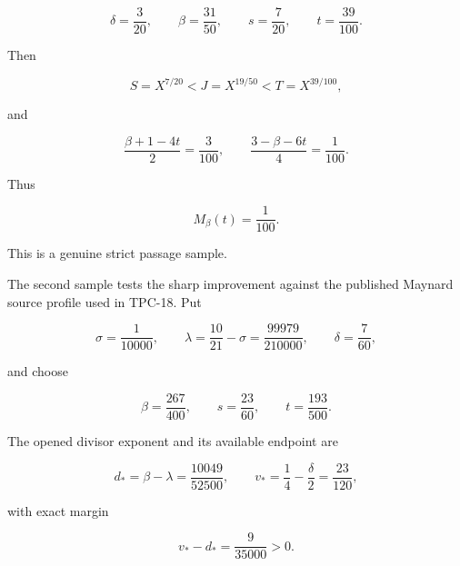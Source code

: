 \begin{equation}
 \delta=\frac3{20},
 \qquad
 \beta=\frac{31}{50},
 \qquad
 s=\frac7{20},
 \qquad
 t=\frac{39}{100}.
 \label{eq:tpc26-old-sample}
\end{equation}

Then

\begin{equation}
 S=X^{7/20}<J=X^{19/50}<T=X^{39/100},
 \label{eq:tpc26-old-sample-scales}
\end{equation}

and

\begin{equation}
 \frac{\beta+1-4t}{2}=\frac3{100},
 \qquad
 \frac{3-\beta-6t}{4}=\frac1{100}.
 \label{eq:tpc26-old-sample-ledger}
\end{equation}

Thus

\begin{equation}
 \boxed{M_\beta(t)=\frac1{100}.}
 \label{eq:tpc26-old-sample-saving}
\end{equation}

This is a genuine strict passage sample.

The second sample tests the sharp improvement against the published
Maynard source profile used in TPC-18.  Put

\begin{equation}
 \sigma=\frac1{10000},
 \qquad
 \lambda=\frac{10}{21}-\sigma
 =\frac{99979}{210000},
 \qquad
 \delta=\frac7{60},
 \label{eq:tpc26-high-sample-source}
\end{equation}

and choose

\begin{equation}
 \beta=\frac{267}{400},
 \qquad
 s=\frac{23}{60},
 \qquad
 t=\frac{193}{500}.
 \label{eq:tpc26-high-sample}
\end{equation}

The opened divisor exponent and its available endpoint are

\begin{equation}
 d_*=\beta-\lambda=\frac{10049}{52500},
 \qquad
 v_*=\frac14-\frac\delta2=\frac{23}{120},
 \label{eq:tpc26-high-sample-dv}
\end{equation}

with exact margin

\begin{equation}
 v_*-d_*=\frac9{35000}>0.
 \label{eq:tpc26-high-sample-row-margin}
\end{equation}

